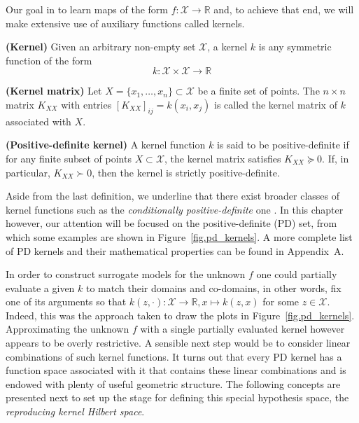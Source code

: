 Our goal in to learn maps of the form $f: \mathcal{X} \rightarrow \mathbb{R}$ and, to achieve that end, we will make extensive use of auxiliary functions called kernels.

\begin{definition}
	\textbf{(Kernel)} Given an arbitrary non-empty set $\mathcal{X}$, a kernel $k$ is any symmetric function of the form
	\begin{equation}
		k: \mathcal{X} \times \mathcal{X} \rightarrow \mathbb{R}
	\end{equation}
\end{definition}

\begin{definition}
	\textbf{(Kernel matrix)} Let $X = \{x_1,\dots,x_n\} \subset \mathcal{X}$ be a finite set of points. The $n \times n$ matrix $K_{XX}$ with entries $[K_{XX}]_{ij} = k(x_i,x_j)$ is called the kernel matrix of $k$ associated with $X$.
\end{definition}

\begin{definition}
	\label{def.pd_kernel}
	\textbf{(Positive-definite kernel)} A kernel function $k$ is said to be positive-definite if for any finite subset of points $X \subset \mathcal{X}$, the kernel matrix satisfies $K_{XX} \succeq 0$. If, in particular, $K_{XX} \succ 0$, then the kernel is strictly positive-definite.
\end{definition}

\begin{remark}
	Aside from the last definition, we underline that there exist broader classes of kernel functions such as the \textit{conditionally positive-definite} one \cite[§2.4]{scholkopf2002learning}\cite[§8]{wendland2004scattered}. In this chapter however, our attention will be focused on the positive-definite (PD) set, from which some examples are shown in Figure~\ref{fig.pd_kernels}. A more complete list of PD kernels and their mathematical properties can be found in Appendix~A.
\end{remark}

In order to construct surrogate models for the unknown $f$ one could partially evaluate a given $k$ to match their domains and co-domains, in other words, fix one of its arguments so that $k(z,\cdot): \mathcal{X} \rightarrow \mathbb{R}, x \mapsto k(z,x)$ for some $z \in \mathcal{X}$. Indeed, this was the approach taken to draw the plots in Figure~\ref{fig.pd_kernels}. Approximating the unknown $f$ with a single partially evaluated kernel however appears to be overly restrictive. A sensible next step would be to consider linear combinations of such kernel functions. It turns out that every PD kernel has a function space associated with it that contains these linear combinations and is endowed with plenty of useful geometric structure. The following concepts are presented next to set up the stage for defining this special hypothesis space, the \textit{reproducing kernel Hilbert space}.

